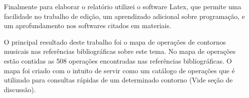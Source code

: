 \documentclass[11pt]{article}
\begin{document}
Finalmente para elaborar o relatório utilizei o software Latex, que
permite uma facilidade no trabalho de edição, um aprendizado adicional
sobre programação, e um aprofundamento nos softwares citados em
materiais.

\label{sec:resultados}


O principal resultado deste trabalho foi o mapa de operações de contornos musicais nas
referências bibliográficas sobre este tema.
No mapa de operações estão contidas as 508 operações
encontradas nas referências bibliográficas.
O mapa foi criado com o intuito de
servir como um catálogo de operações que é utilizado para consultas rápidas
de um determinado contorno (Vide seção de discussão).
\end{document}
